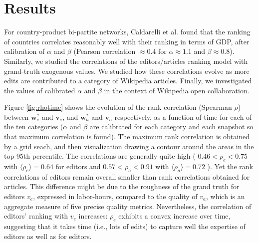 \section{Results}
For country-product bi-partite networks,  Caldarelli et al. \cite{caldarelli2012network} found that the ranking of countries correlates reasonably well with their ranking in terms of GDP, after calibration of $\alpha$ and $\beta$ (Pearson correlation $\approx 0.4$ for $\alpha \approx 1.1$ and $\beta \approx 0.8$). Similarly, we studied the correlations of the editors/articles ranking model with grand-truth exogenous values. We studied how these correlations evolve as more edits are contributed to a category of Wikipedia articles. Finally, we investigated the values of calibrated $\alpha$ and $\beta$ in the context of Wikipedia open collaboration.

Figure \ref{fig:rhotime} shows the evolution of the rank correlation (Spearman $\rho$) between $\mathbf{w}^*_e$ and $\mathbf{v}_e$, and $\mathbf{w}^*_a$ and $\mathbf{v}_a$ respectively, as a function of time for each of the ten categories ($\alpha$ and $\beta$ are calibrated for each category and each snapshot so that maximum correlation is found). The maximum rank correlation is obtained by a grid seach, and then visualization drawing a contour around the areas in the top 95th percentile.
The correlations are generally quite high ( $ 0.46 < \rho_e < 0.75$ with $\langle \rho_e\rangle = 0.64$ for editors and $0.57 < \rho_a < 0.91$ with $\langle \rho_a\rangle = 0.72$ ). Yet the rank correlations of editors remain overall smaller than rank correlations obtained for articles. This difference might be due to the roughness of the grand truth for editors $v_e$, expressed in labor-hours, compared to the quality of $v_a$, which is an aggregate measure of five precise quality metrics. Nevertheless, the correlation of editors' ranking with $v_e$ increases: $\rho_e$ exhibits a convex increase over time, suggesting that it takes time (i.e., lots of edits) to capture well the expertise of editors as well as for editors. 


